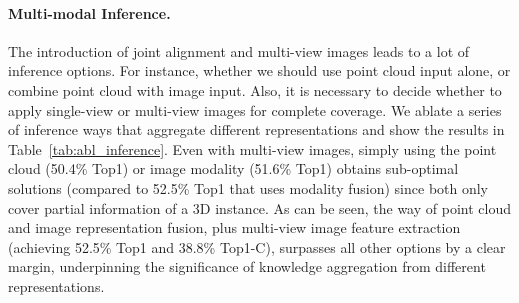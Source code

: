 \documentclass{article} \usepackage{iclr2024_conference,times}
\begin{document}
\begin{table*}[b]
\hfill
\begin{subtable}[h]{0.32\textwidth}
\caption{Multi-Modal Inference}
\label{tab:abl_inference} 
\end{subtable}
\end{table*} \paragraph{Multi-modal Inference.}
The introduction of joint alignment and multi-view images leads to a lot of inference options. 
For instance, whether we should use point cloud input alone, or combine point cloud with image input. 
Also, it is necessary to decide whether to apply single-view or multi-view images for complete coverage.
We ablate a series of inference ways that aggregate different representations and show the results in Table~\ref{tab:abl_inference}. 
Even with multi-view images, simply using the point cloud (50.4\% Top1) or image modality (51.6\% Top1) obtains sub-optimal solutions (compared to 52.5\% Top1 that uses modality fusion) since both only cover partial information of a 3D instance.
As can be seen, the way of point cloud and image representation fusion, plus multi-view image feature extraction (achieving 52.5\% Top1 and 38.8\% Top1-C), surpasses all other options by a clear margin, underpinning the significance of knowledge aggregation from different representations.
\end{document}
